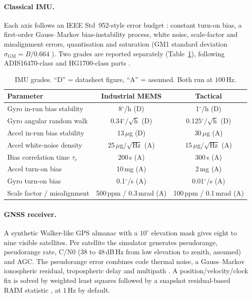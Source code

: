 \documentclass[12pt,a4paper]{article}
\begin{document}
\paragraph{Classical IMU.}
Each axis follows an IEEE Std~952-style error budget \cite{ieee952}: constant turn-on bias, a first-order Gauss--Markov bias-instability process, white noise, scale-factor and misalignment errors, quantisation and saturation (GM1 standard deviation $\sigma_{\mathrm{GM}} = B/0.664$ \cite{jurado2019regression}). Two grades are reported separately (Table~\ref{tab:imu}), following ADIS16470-class and HG1700-class parts \cite{adi2017adis16470,honeywell2025hg1700}.

\begin{table}[ht]
\centering
\caption{IMU grades. ``D'' = datasheet figure, ``A'' = assumed. Both run at $100\,\mathrm{Hz}$.}
\label{tab:imu}
\small
\begin{tabular}{lcc}
\toprule
Parameter & Industrial MEMS & Tactical \\
\midrule
Gyro in-run bias stability & 8$^\circ$/h (D) & 1$^\circ$/h (D) \\
Gyro angular random walk & 0.34$^\circ/\sqrt{\mathrm{h}}$ (D) & 0.125$^\circ/\sqrt{\mathrm{h}}$ (D) \\
Accel in-run bias stability & 13\,$\mu$g (D) & 30\,$\mu$g (A) \\
Accel white-noise density & 25\,$\mu$g/$\sqrt{\mathrm{Hz}}$ (A) & 15\,$\mu$g/$\sqrt{\mathrm{Hz}}$ (A) \\
Bias correlation time $\tau_c$ & 200\,s (A) & 300\,s (A) \\
Accel turn-on bias & 10\,mg (A) & 2\,mg (A) \\
Gyro turn-on bias & 0.1$^\circ$/s (A) & 0.01$^\circ$/s (A) \\
Scale factor / misalignment & 500\,ppm / 0.3\,mrad (A) & 100\,ppm / 0.1\,mrad (A) \\
\bottomrule
\end{tabular}
\end{table}

\paragraph{GNSS receiver.}
A synthetic Walker-like GPS almanac with a $10^\circ$ elevation mask gives eight to nine visible satellites. Per satellite the simulator generates pseudorange, pseudorange rate, C/N0 (38 to 48\,dB\,Hz from low elevation to zenith, assumed) and AGC. The pseudorange error combines code thermal noise, a Gauss--Markov ionospheric residual, tropospheric delay and multipath \cite{kaplan2017understanding}. A position/velocity/clock fix is solved by weighted least squares \cite{misra2006global} followed by a snapshot residual-based RAIM statistic \cite{pullen2020gnss}, at $1\,\mathrm{Hz}$ by default.
\end{document}
